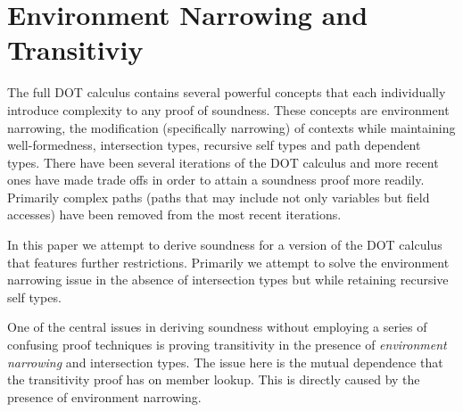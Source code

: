 \section{Environment Narrowing and Transitiviy}

The full DOT calculus contains several powerful concepts that each individually introduce complexity to any proof of soundness. These concepts are environment narrowing, the modification (specifically narrowing) of contexts while maintaining well-formedness, intersection types, recursive self types and path dependent types. There have been several iterations of the DOT calculus and more recent ones have made trade offs in order to attain a soundness proof more readily. Primarily complex paths (paths that may include not only variables but field accesses) have been removed from the most recent iterations.

In this paper we attempt to derive soundness for a version of the DOT calculus that features further restrictions. Primarily we attempt to solve the environment narrowing issue in the absence of intersection types but while retaining recursive self types.

One of the central issues in deriving soundness without employing a series of confusing proof techniques is proving transitivity in the presence of \emph{environment narrowing} and intersection types. The issue here is the mutual dependence that the transitivity proof has on member lookup. This is directly caused by the presence of environment narrowing. 
